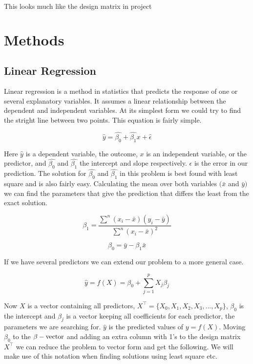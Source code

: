 \documentclass[a4paper,12pt, english]{article}
\begin{document}
This looks much like the design matrix in project 

\section{Methods}

\subsection{Linear Regression}

Linear regression is a method in statistics that predicts the response of one or several explanatory variables. It assumes a linear relationship between the dependent and independent variables. At its simplest form we could try to find the stright line between two points. This equation is fairly simple.

\begin{equation*}
\hat{y} = \hat{\beta_{0}} + \hat{\beta_{1}}x + \hat{\epsilon}
\end{equation*}

Here $\hat{y}$ is a dependent variable, the outcome, $x$ is an independent variable, or the predictor, and $\hat{\beta_{0}}$ and $\hat{\beta_{1}}$ the intercept and slope respectively. $\epsilon$ is the error in our prediction. The solution for $\hat{\beta_{0}}$ and $\hat{\beta_{1}}$ in this problem is best found with least square and is also fairly easy. Calculating the mean over both variables $(\bar{x}$ and $\bar{y})$ we can find the parameters that give the prediction that differs the least from the exact solution.

\begin{equation*}
\beta_1 = \frac{\sum^n (x_i - \bar{x})(y_i - \bar{y})}{\sum^n (x_i - \bar{x})^2}
\end{equation*}

\begin{equation*}
\beta_0 = \bar{y} - \beta_1 \bar{x}
\end{equation*}

If we have several predictors we can extend our problem to a more general case.

\begin{equation*}
\hat{y} = f(X) = \beta_{0} + \sum_{j=1}^{p} X_{j} \beta_{j}
\end{equation*}

Now $X$ is a vector containing all predictors, $X^{\top} = \{X_0, X_1, X_2, X_3,..., X_p\}$, $\beta_0$ is the intercept and $\beta_j$ is a vector keeping all coefficients for each predictor, the parameters we are searching for. $\hat{y}$ is the predicted values of $y = f(X)$. Moving $\beta_0$ to the $\beta-\textnormal{vector}$ and adding an extra column with 1's to the design matrix $X^{\top}$ we can reduce the problem to vector form and get the following. We will make use of this notation when finding solutions using least square etc. 
\end{document}
